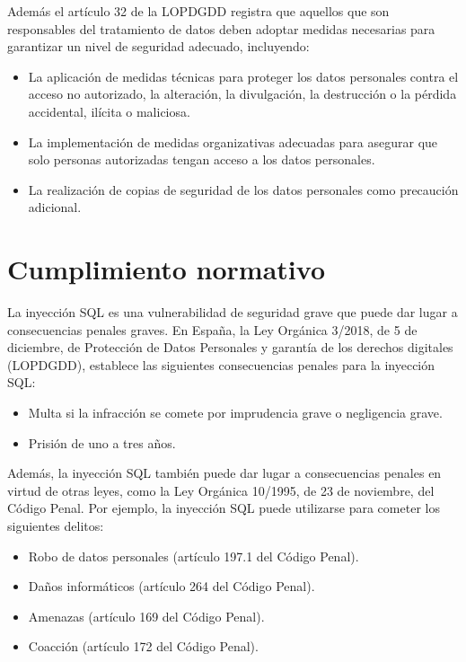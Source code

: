\documentclass[11pt]{report}
\begin{document}
Además el artículo 32 de la LOPDGDD registra que aquellos que son responsables del tratamiento de datos deben adoptar medidas necesarias para
garantizar un nivel de seguridad adecuado, incluyendo:

\begin{itemize}
  \item La aplicación de medidas técnicas para proteger los datos personales contra el acceso no autorizado, la alteración, la divulgación,
  la destrucción o la pérdida accidental, ilícita o maliciosa.

  \item La implementación de medidas organizativas adecuadas para asegurar que solo personas autorizadas tengan acceso a los datos personales.

  \item La realización de copias de seguridad de los datos personales como precaución adicional.
\end{itemize}

\section{Cumplimiento normativo}
La inyección SQL es una vulnerabilidad de seguridad grave que puede dar lugar a consecuencias penales graves. En España, la Ley Orgánica 3/2018,
de 5 de diciembre, de Protección de Datos Personales y garantía de los derechos digitales (LOPDGDD), establece las siguientes consecuencias penales
para la inyección SQL:
\begin{itemize}
  \item Multa si la infracción se comete por imprudencia grave o negligencia grave.
  \item Prisión de uno a tres años.
\end{itemize}

Además, la inyección SQL también puede dar lugar a consecuencias penales en virtud de otras leyes, como la Ley Orgánica 10/1995, de 23 de noviembre,
del Código Penal. Por ejemplo, la inyección SQL puede utilizarse para cometer los siguientes delitos:
\begin{itemize}
  \item Robo de datos personales (artículo 197.1 del Código Penal).
  \item Daños informáticos (artículo 264 del Código Penal).
  \item Amenazas (artículo 169 del Código Penal).
  \item Coacción (artículo 172 del Código Penal).
\end{itemize}
\end{document}
